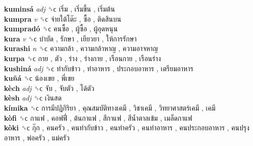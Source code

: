 \textbf{kuminsá} \emph{adj}  ␝ϲ   เริ่ม ,  เริ่มขึ้น ,  เริ่มต้น   \\
\textbf{kumpra} \emph{v}  ␝ϲ   จ่ายใต้โต๊ะ ,  ซื้อ ,  ติดสินบน   \\
\textbf{kumpradó} ␝ϲ   คนซื้อ ,  ผู้ซื้อ ,  ผู้อุดหนุน   \\
\textbf{kura} \emph{v}  ␝ϲ   บำบัด ,  รักษา ,  เยียวยา ,  ให้การรักษา   \\
\textbf{kurashi} \emph{n}  ␝ϲ   ความกล้า ,  ความกล้าหาญ ,  ความอาจหาญ   \\
\textbf{kurpa} ␝ϲ   กาย ,  ตัว ,  ร่าง ,  ร่างกาย ,  เรือนกาย ,  เรือนร่าง   \\
\textbf{kushiná} \emph{adj}  ␝ϲ   ทำกับข้าว ,  ทำอาหาร ,  ประกอบอาหาร ,  เตรียมอาหาร   \\
\textbf{kuñá} ␝ϲ   น้องเขย ,  พี่เขย   \\
\textbf{kèch} \emph{adj}  ␝ϲ   จับ ,  จับตัว ,  ได้ตัว   \\
\textbf{kèsh} \emph{adj}  ␝ϲ   เงินสด   \\
\textbf{kímika} ␝ϲ   การมีปฏิกิริยา ,  คุณสมบัติทางเคมี ,  วิชาเคมี ,  วิทยาศาสตร์เคมี ,  เคมี   \\
\textbf{kòfi} ␝ϲ   กาแฟ ,  คอฟฟี่ ,  ต้นกาแฟ ,  สีกาแฟ ,  สีน้ำตาลเข้ม ,  เมล็ดกาแฟ   \\
\textbf{kòki} ␝ϲ   กุ๊ก ,  คนครัว ,  คนทำกับข้าว ,  คนทำครัว ,  คนทำอาหาร ,  คนประกอบอาหาร ,  คนปรุงอาหาร ,  พ่อครัว ,  แม่ครัว   \\
